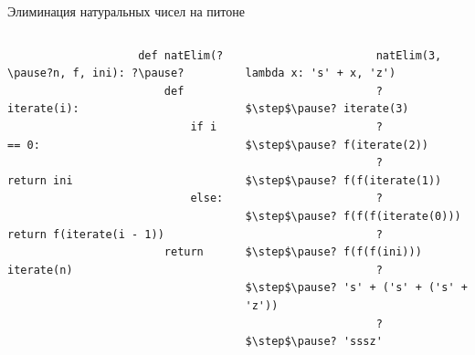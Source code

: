     \begin{frame}[fragile]{Элиминация натуральных чисел на питоне}
        \vspace{-1em}
        \begin{columns}[onlytextwidth]
            \begin{column}[t]{0.475\textwidth}
                \begin{verbatim}
                    def natElim(?\pause?n, f, ini): ?\pause?
                        def iterate(i):
                            if i == 0:
                                return ini
                            else:
                                return f(iterate(i - 1))
                        return iterate(n)
                \end{verbatim}
            \end{column}\hfill
            \pause%
            \begin{column}[t]{0.495\textwidth}
                \begin{verbatim}
                    natElim(3, lambda x: 's' + x, 'z')
                    ?$\step$\pause? iterate(3)
                    ?$\step$\pause? f(iterate(2))
                    ?$\step$\pause? f(f(iterate(1))
                    ?$\step$\pause? f(f(f(iterate(0)))
                    ?$\step$\pause? f(f(f(ini)))
                    ?$\step$\pause? 's' + ('s' + ('s' + 'z'))
                    ?$\step$\pause? 'sssz'
                \end{verbatim}
            \end{column}
        \end{columns}
    \end{frame}

